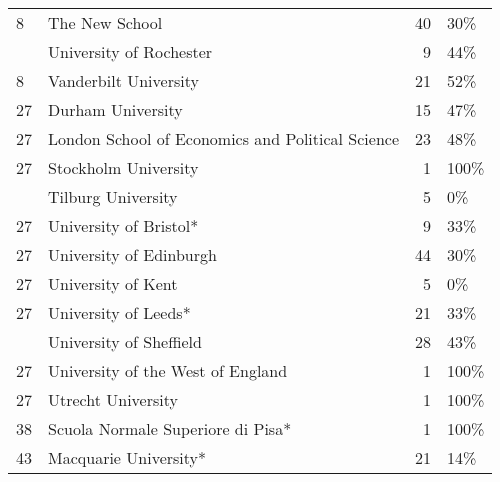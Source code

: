 \begin{table}
\begin{tabular}[t]{llrl}
8 & The New School & 40 & 30\%\\
\addlinespace
8 & University of Rochester & 9 & 44\%\\
8 & Vanderbilt University & 21 & 52\%\\
27 & Durham University & 15 & 47\%\\
27 & London School of Economics and Political Science & 23 & 48\%\\
27 & Stockholm University & 1 & 100\%\\
\addlinespace
27 & Tilburg University & 5 & 0\%\\
27 & University of Bristol* & 9 & 33\%\\
27 & University of Edinburgh & 44 & 30\%\\
27 & University of Kent & 5 & 0\%\\
27 & University of Leeds* & 21 & 33\%\\
\addlinespace
27 & University of Sheffield & 28 & 43\%\\
27 & University of the West of England & 1 & 100\%\\
27 & Utrecht University & 1 & 100\%\\
38 & Scuola Normale Superiore di Pisa* & 1 & 100\%\\
43 & Macquarie University* & 21 & 14\%\\
\bottomrule
\end{tabular}
\end{table}